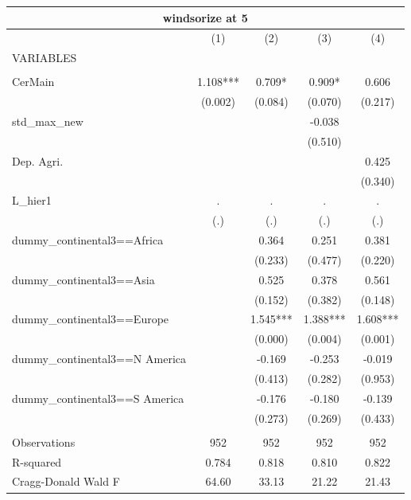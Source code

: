 \documentclass[12pt,a4paper]{article}
\begin{document}
\begin{tabular}{lcccc}
\multicolumn{5}{c}{windsorize at 5} \\ \hline
 & (1) & (2) & (3) & (4) \\
VARIABLES &  &  &  &  \\ \hline
 &  &  &  &  \\
CerMain & 1.108*** & 0.709* & 0.909* & 0.606 \\
 & (0.002) & (0.084) & (0.070) & (0.217) \\
std\_max\_new &  &  & -0.038 &  \\
 &  &  & (0.510) &  \\
Dep. Agri. &  &  &  & 0.425 \\
 &  &  &  & (0.340) \\
L\_hier1 & . & . & . & . \\
 & (.) & (.) & (.) & (.) \\
dummy\_continental3==Africa &  & 0.364 & 0.251 & 0.381 \\
 &  & (0.233) & (0.477) & (0.220) \\
dummy\_continental3==Asia &  & 0.525 & 0.378 & 0.561 \\
 &  & (0.152) & (0.382) & (0.148) \\
dummy\_continental3==Europe &  & 1.545*** & 1.388*** & 1.608*** \\
 &  & (0.000) & (0.004) & (0.001) \\
dummy\_continental3==N America &  & -0.169 & -0.253 & -0.019 \\
 &  & (0.413) & (0.282) & (0.953) \\
dummy\_continental3==S America &  & -0.176 & -0.180 & -0.139 \\
 &  & (0.273) & (0.269) & (0.433) \\
 &  &  &  &  \\
Observations & 952 & 952 & 952 & 952 \\
R-squared & 0.784 & 0.818 & 0.810 & 0.822 \\
 Cragg-Donald Wald F & 64.60 & 33.13 & 21.22 & 21.43 \\ \hline
\end{tabular}
\end{document}
